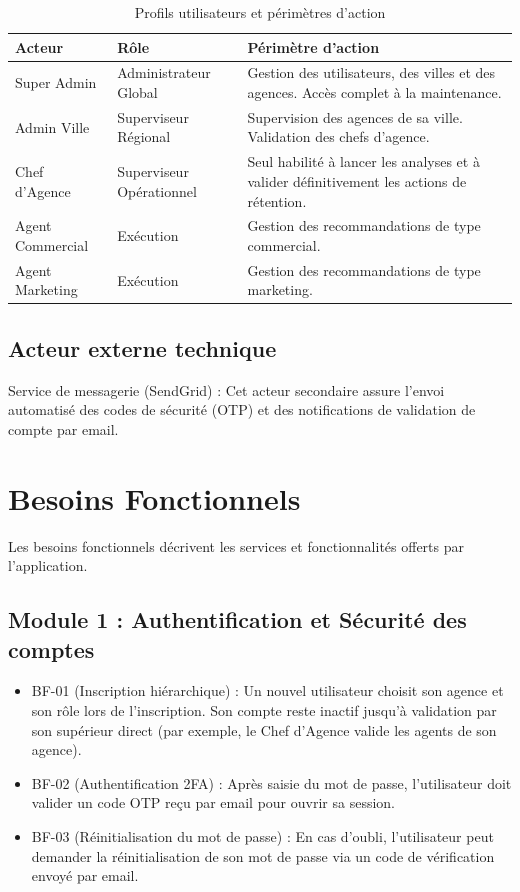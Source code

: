 \begin{table}[htbp]
    \centering
    \caption{Profils utilisateurs et périmètres d'action}
    \label{tab:acteurs_corrige}
    \begin{tabular}{|p{3.2cm}|p{4.5cm}|p{6cm}|}
        \hline
        Acteur & Rôle & Périmètre d'action \\
        \hline
        Super Admin & Administrateur Global & Gestion des utilisateurs, des villes et des agences. Accès complet à la maintenance. \\
        \hline
        Admin Ville & Superviseur Régional & Supervision des agences de sa ville. Validation des chefs d'agence. \\
        \hline
        Chef d'Agence & Superviseur Opérationnel & Seul habilité à lancer les analyses et à valider définitivement les actions de rétention. \\
        \hline
        Agent Commercial & Exécution & Gestion des recommandations de type commercial. \\
        \hline
        Agent Marketing & Exécution & Gestion des recommandations de type marketing. \\
        \hline
    \end{tabular}
\end{table}

\subsection{Acteur externe technique}
Service de messagerie (SendGrid) : Cet acteur secondaire assure l'envoi automatisé des codes de sécurité (OTP) et des notifications de validation de compte par email.

\section{Besoins Fonctionnels}

Les besoins fonctionnels décrivent les services et fonctionnalités offerts par l'application.

\subsection{Module 1 : Authentification et Sécurité des comptes}
\begin{itemize}
    \item BF-01 (Inscription hiérarchique) : Un nouvel utilisateur choisit son agence et son rôle lors de l'inscription. Son compte reste inactif jusqu'à validation par son supérieur direct (par exemple, le Chef d'Agence valide les agents de son agence).
    \item BF-02 (Authentification 2FA) : Après saisie du mot de passe, l'utilisateur doit valider un code OTP reçu par email pour ouvrir sa session.
    \item BF-03 (Réinitialisation du mot de passe) : En cas d'oubli, l'utilisateur peut demander la réinitialisation de son mot de passe via un code de vérification envoyé par email.
\end{itemize}

